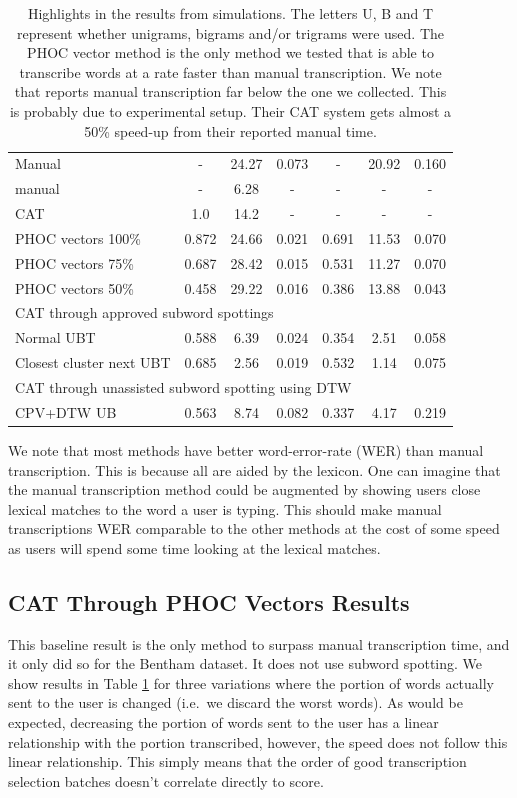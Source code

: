 \documentclass[ms,electronic,twosidetoc,letterpaper,chaptercenter,parttop,lof,lot]{byumsphd}
\begin{document}
\begin{table}
\begin{tabular}{| l | c  c  c | c c c |}
  Manual             & -   & 24.27 & 0.073 &  -   & 20.92 & 0.160 \\
  \cite{Zagoris2015} manual & -   & 6.28 & - &  -   & -& - \\
  \cite{Zagoris2015} CAT & 1.0   & 14.2 & - &  -   & -& - \\
  \hline	
  PHOC vectors 100\% & 0.872 & 24.66 & 0.021 &  0.691 & 11.53 & 0.070 \\
  PHOC vectors 75\%  & 0.687 & 28.42 & 0.015 &  0.531 & 11.27 & 0.070 \\
  PHOC vectors 50\%  & 0.458 & 29.22 & 0.016 &  0.386 & 13.88 & 0.043 \\
  \hline	
  \multicolumn{7}{|l|}{CAT through approved subword spottings} \\
  Normal UBT & 0.588 & 6.39 & 0.024 &  0.354 & 2.51 & 0.058 \\
  Closest cluster next UBT & 0.685 & 2.56 & 0.019 & 0.532 & 1.14 & 0.075 \\
  \hline	
  \multicolumn{7}{|l|}{CAT through unassisted subword spotting using DTW} \\
  CPV+DTW UB & 0.563 & 8.74 & 0.082 & 0.337 & 4.17 & 0.219  \\
  \hline  
\end{tabular}
\caption{Highlights in the results from simulations. The letters U, B and T represent whether unigrams, bigrams and/or trigrams were used. The PHOC vector method is the only method we tested that is able to transcribe words at a rate faster than manual transcription. We note that \cite{Zagoris2015} reports manual transcription far below the one we collected. This is probably due to experimental setup. Their CAT system gets almost a 50\% speed-up from their reported manual time.}
\label{tab:finalresults}
\end{table}

We note that most methods have better word-error-rate (WER) than manual transcription. This is because all are aided by the lexicon. One can imagine that the manual transcription method could be augmented by showing users close lexical matches to the word a user is typing. This should make manual transcriptions WER comparable to the other methods at the cost of some speed as users will spend some time looking at the lexical matches.


\subsection{CAT Through PHOC Vectors Results}
This baseline result is the only method to surpass manual transcription time, and it only did so for the Bentham dataset. It does not use subword spotting. We show results in Table \ref{tab:finalresults} for three variations where the portion of words actually sent to the user is changed (i.e.~we discard the worst words). As would be expected, decreasing the portion of words sent to the user has a linear relationship with the portion transcribed, however, the speed does not follow this linear relationship. This simply means that the order of good transcription selection batches doesn't correlate directly to score.
\end{document}
